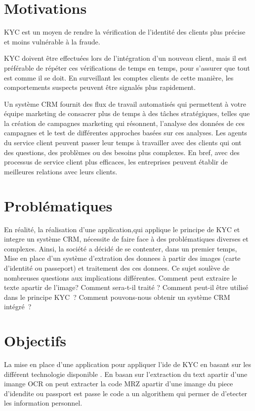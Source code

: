 \section{Motivations}    

KYC est un moyen de rendre la vérification de l'identité des clients plus précise et moins vulnérable à la fraude.

KYC doivent être effectuées lors de l'intégration d'un nouveau client, mais il est préférable de répéter ces vérifications de temps en temps, pour s'assurer que tout est comme il se doit. En surveillant les comptes clients de cette manière, les comportements suspects peuvent être signalés plus rapidement.

Un système CRM fournit des flux de travail automatisés qui permettent à votre équipe marketing de consacrer plus de temps à des tâches stratégiques, telles que la création de campagnes marketing qui résonnent, l'analyse des données de ces campagnes et le test de différentes approches basées sur ces analyses. Les agents du service client peuvent passer leur temps à travailler avec des clients qui ont des questions, des problèmes ou des besoins plus complexes. En bref, avec des processus de service client plus efficaces, les entreprises peuvent établir de meilleures relations avec leurs clients.

\section{Problématiques}	

En réalité, la réalisation d'une application,qui applique le principe de KYC et integre un  système CRM,
nécessite
de faire face à des problématiques diverses et complexes. Ainsi, la société a décidé de se contenter,
dans un premier temps, Mise en place d’un système d’extration des donnees à partir des images (carte d'identité ou passeport) et traitement des ces donnees.
Ce sujet soulève de nombreuses questions aux implications différentes. Comment peut extraire le texte apartir de l'image? Comment sera-t-il traité ? Comment peut-il être utilisé dans le principe KYC ? Comment pouvons-nous obtenir un système CRM intégré ?


\section{Objectifs}

La mise en place d'une application pour appliquer l'ide de KYC en basant sur les différent technologie disponible . En basan sur l'extraction du text apartir d'une imange OCR on peut extracter la code MRZ apartir d'une imange du piece d'idendite ou passport est passe le code a un algorithem qui permer de d'etecter les information personnel.


